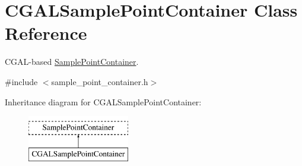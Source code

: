 \hypertarget{classCGALSamplePointContainer}{}\section{C\+G\+A\+L\+Sample\+Point\+Container Class Reference}
\label{classCGALSamplePointContainer}


C\+G\+A\+L-\/based \hyperlink{classSamplePointContainer}{Sample\+Point\+Container}.  




{\ttfamily \#include $<$sample\+\_\+point\+\_\+container.\+h$>$}

Inheritance diagram for C\+G\+A\+L\+Sample\+Point\+Container\+:\begin{figure}[H]
\begin{center}
\leavevmode
\includegraphics[height=2.000000cm]{classCGALSamplePointContainer}
\end{center}
\end{figure}
